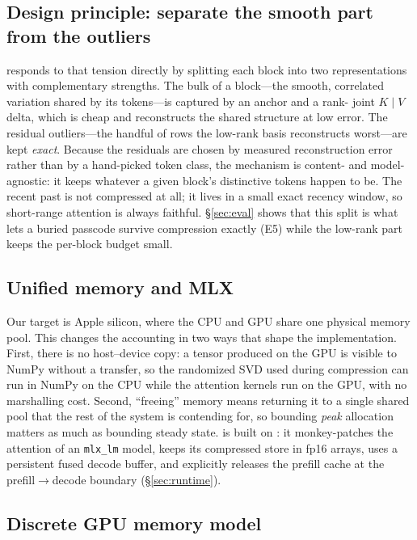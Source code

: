 \subsection{Design principle: separate the smooth part from the outliers}
\dkv{} responds to that tension directly by splitting each block into two representations
with complementary strengths. The bulk of a block---the smooth, correlated variation shared by
its tokens---is captured by an anchor and a rank-\rank{} joint $K\!\mid\!V$ delta, which is cheap
and reconstructs the shared structure at low error. The residual outliers---the handful of rows
the low-rank basis reconstructs worst---are kept \emph{exact}. Because the residuals are chosen
by measured reconstruction error rather than by a hand-picked token class, the mechanism is
content- and model-agnostic: it keeps whatever a given block's distinctive tokens happen to be.
The recent past is not compressed at all; it lives in a small exact recency window, so
short-range attention is always faithful. \S\ref{sec:eval} shows that this split is what lets a
buried passcode survive compression exactly (E5) while the low-rank part keeps the per-block
budget small.

\subsection{Unified memory and MLX}
Our target is Apple silicon, where the CPU and GPU share one physical memory pool. This changes
the accounting in two ways that shape the implementation. First, there is no host--device copy:
a tensor produced on the GPU is visible to NumPy without a transfer, so the randomized SVD used
during compression can run in NumPy on the CPU while the attention kernels run on the GPU, with
no marshalling cost. Second, ``freeing'' memory means returning it to a single shared pool that
the rest of the system is contending for, so bounding \emph{peak} allocation matters as much as
bounding steady state. \dkv{} is built on \mlxe{}: it monkey-patches the attention of an
\texttt{mlx\_lm} model, keeps its compressed store in \mlxe{} fp16 arrays, uses a persistent fused
decode buffer, and explicitly releases the prefill cache at the prefill$\to$decode boundary
(\S\ref{sec:runtime}).

\subsection{Discrete GPU memory model}
\label{sec:background-cuda}

